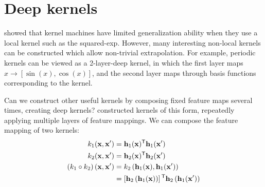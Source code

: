 \documentclass[twoside]{article}
\makeatletter
\newlength{\nonHumbleHeight}
\def\@humbleformat#1{{\settoheight{\nonHumbleHeight}{#1}\resizebox{!}{0.94\nonHumbleHeight}{#1}}}%
\newcommand\humble[1]{{\@humbleformat{#1}}}%
\newcommand{\MLP}{{\humble{MLP}}}
\newcommand{\hPhi}{\vh}
\newcommand{\sectiondist}{}
\makeatother
\begin{document}



\section{Deep kernels}
\label{sec:deep_kernels}
\sectiondist

\cite{NIPS2005_424} showed that kernel machines have limited generalization ability when they use a local kernel such as the squared-exp.
However, many interesting non-local kernels can be constructed which allow non-trivial extrapolation.
For example, periodic kernels can be viewed as a 2-layer-deep kernel, in which the first layer maps $x \rightarrow [\sin(x), \cos(x)]$, and the second layer maps through basis functions corresponding to the \humble{SE} kernel.

 
Can we construct other useful kernels by composing fixed feature maps several times, creating deep kernels?  \citet{cho2012kernel} constructed kernels of this form, repeatedly applying multiple layers of feature mappings.
We can compose the feature mapping of two kernels:
\begin{align}
k_{1}(\vx, \vx') & = \hPhi_1(\vx) \tra \hPhi_1(\vx') \\
k_{2}(\vx, \vx') & = \hPhi_2(\vx) \tra \hPhi_2(\vx') \\
\left( k_1 \circ k_2 \right)(\vx, \vx') & = k_2 \left(\hPhi_1(\vx), \hPhi_1(\vx') \right) \\
& = \left[ \hPhi_2 \left( \hPhi_1(\vx) \right)\right] \tra \hPhi_2 \left(\hPhi_1(\vx') \right) 
\end{align}
\end{document}
